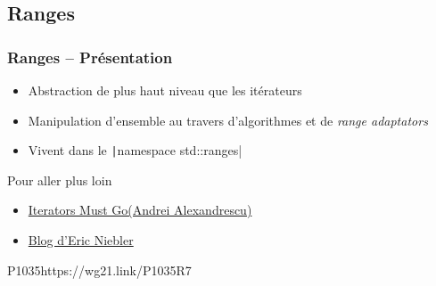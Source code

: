 \documentclass[C++.tex]{subfiles}
\begin{document}
\subsection*{Ranges}
\begin{frame}
	\frametitle{Ranges -- Présentation}
	\begin{itemize}
		\item Abstraction de plus haut niveau que les itérateurs
		\item Manipulation d'ensemble au travers d'algorithmes et de \textit{range adaptators}
		\item Vivent dans le \texttt|namespace std::ranges|

	\end{itemize}

	\begin{block}{Pour aller plus loin}
		\begin{itemize}
			\item \href{https://accu.org/content/conf2009/AndreiAlexandrescu_iterators-must-go.pdf}{Iterators Must Go\linklogo (Andrei Alexandrescu)}


			\item \href{http://ericniebler.com/}{Blog d'Eric Niebler\linklogo}
		\end{itemize}
	\end{block}

		{P1035}{https://wg21.link/P1035R7}
\end{frame}
\end{document}
